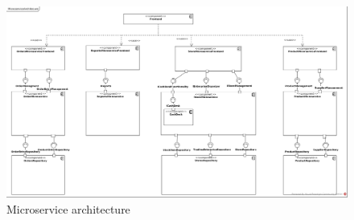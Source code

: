 	
	\begin{figure}
	   	\includegraphics[width=\textwidth]{img/MicroserviceArchitecture.jpg}
	   	\caption{Microservice architecture}
	   	\label{MS_ARch}
	\end{figure}
